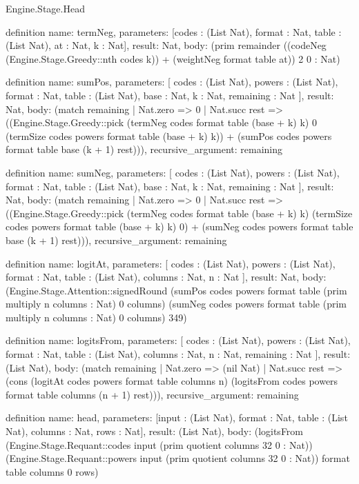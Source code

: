 \begin{lexlean}{Engine.Stage.Head}
\begin{semanticmodule}
definition{
  name: termNeg,
  parameters: [codes : (List Nat), format : Nat, table : (List Nat), at : Nat, k : Nat],
  result: Nat,
  body: (prim remainder ((codeNeg (Engine.Stage.Greedy::nth codes k)) + (weightNeg format table at)) 2 0 : Nat)
}

definition{
  name: sumPos,
  parameters: [
    codes : (List Nat),
    powers : (List Nat),
    format : Nat,
    table : (List Nat),
    base : Nat,
    k : Nat,
    remaining : Nat
  ],
  result: Nat,
  body: (match remaining
    | Nat.zero => 0
    | Nat.succ rest => ((Engine.Stage.Greedy::pick (termNeg codes format table (base + k) k) 0 (termSize codes powers format table (base + k) k)) + (sumPos codes powers format table base (k + 1) rest))),
  recursive_argument: remaining
}

definition{
  name: sumNeg,
  parameters: [
    codes : (List Nat),
    powers : (List Nat),
    format : Nat,
    table : (List Nat),
    base : Nat,
    k : Nat,
    remaining : Nat
  ],
  result: Nat,
  body: (match remaining
    | Nat.zero => 0
    | Nat.succ rest => ((Engine.Stage.Greedy::pick (termNeg codes format table (base + k) k) (termSize codes powers format table (base + k) k) 0) + (sumNeg codes powers format table base (k + 1) rest))),
  recursive_argument: remaining
}

definition{
  name: logitAt,
  parameters: [
    codes : (List Nat),
    powers : (List Nat),
    format : Nat,
    table : (List Nat),
    columns : Nat,
    n : Nat
  ],
  result: Nat,
  body: (Engine.Stage.Attention::signedRound (sumPos codes powers format table (prim multiply n columns : Nat) 0 columns) (sumNeg codes powers format table (prim multiply n columns : Nat) 0 columns) 349)
}

definition{
  name: logitsFrom,
  parameters: [
    codes : (List Nat),
    powers : (List Nat),
    format : Nat,
    table : (List Nat),
    columns : Nat,
    n : Nat,
    remaining : Nat
  ],
  result: (List Nat),
  body: (match remaining
    | Nat.zero => (nil Nat)
    | Nat.succ rest => (cons (logitAt codes powers format table columns n) (logitsFrom codes powers format table columns (n + 1) rest))),
  recursive_argument: remaining
}

definition{
  name: head,
  parameters: [input : (List Nat), format : Nat, table : (List Nat), columns : Nat, rows : Nat],
  result: (List Nat),
  body: (logitsFrom (Engine.Stage.Requant::codes input (prim quotient columns 32 0 : Nat)) (Engine.Stage.Requant::powers input (prim quotient columns 32 0 : Nat)) format table columns 0 rows)
}
\end{semanticmodule}
\end{lexlean}
